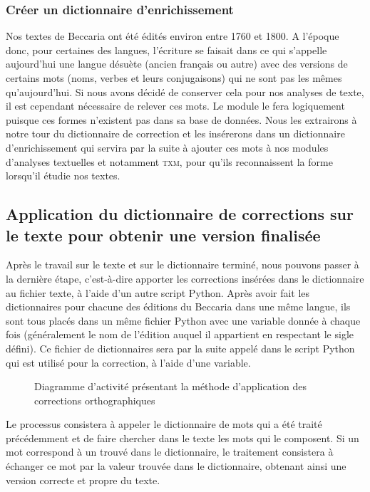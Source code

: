 \subsubsection{Créer un dictionnaire d'enrichissement}
Nos textes de Beccaria ont été édités environ entre 1760 et 1800. A l'époque donc, pour certaines des langues, l'écriture se faisait dans ce qui s'appelle aujourd'hui une langue désuète (ancien français ou autre) avec des versions de certains mots (noms, verbes et leurs conjugaisons) qui ne sont pas les mêmes qu'aujourd'hui. Si nous avons décidé de conserver cela pour nos analyses de texte, il est cependant nécessaire de relever ces mots. Le module le fera logiquement puisque ces formes n'existent pas dans sa base de données. Nous les extrairons à notre tour du dictionnaire de correction et les insérerons dans un dictionnaire d'enrichissement qui servira par la suite à ajouter ces mots à nos modules d'analyses textuelles et notamment \textsc{txm}, pour qu'ils reconnaissent la forme lorsqu'il étudie nos textes.

\subsection{Application du dictionnaire de corrections sur le texte pour obtenir une version finalisée}
Après le travail sur le texte et sur le dictionnaire terminé, nous pouvons passer à la dernière étape, c'est-à-dire apporter les corrections insérées dans le dictionnaire au fichier texte, à l'aide d'un autre script Python.  Après avoir fait les dictionnaires pour chacune des éditions du Beccaria dans une même langue, ils sont tous placés dans un même fichier Python avec une variable donnée à chaque fois (généralement le nom de l'édition auquel il appartient en respectant le sigle défini). Ce fichier de dictionnaires sera par la suite appelé dans le script Python qui est utilisé pour la correction, à l'aide d'une variable.
\begin{figure}[H]
    \centering
    \caption{Diagramme d'activité présentant la méthode d'application des corrections orthographiques}
    \label{fig:etape5}
\end{figure}
Le processus consistera à appeler le dictionnaire de mots qui a été traité précédemment et de faire chercher dans le texte les mots qui le composent. Si un mot correspond à un trouvé dans le dictionnaire, le traitement consistera à échanger ce mot par la valeur trouvée dans le dictionnaire, obtenant ainsi une version correcte et propre du texte.

